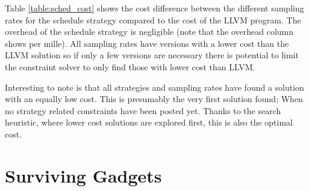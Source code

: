 \begin{table}[h]
		\centering
		\noindent\makebox[\textwidth]{%
			
		}
		\caption{The cost of the different sampling rates for the schedule strategy compared to the LLVM solution.%
		The difference column is the difference between the median cost of the sampling rate and the cost of the LLVM solution.}
		\label{table:sched_cost}
\end{table}

Table \ref{table:sched_cost} shows the cost difference between the different sampling
rates for the schedule strategy compared to the cost of the LLVM program. The overhead of
the schedule strategy is negligible (note that the overhead column shows per mille). All
sampling rates have versions with a lower cost than the LLVM solution so if only a few
versions are necessary there is potential to limit the constraint solver to only find
those with lower cost than LLVM.

Interesting to note is that all strategies and sampling rates have found a solution with
an equally low cost. This is presumably the very first solution found; When no strategy
related constraints have been posted yet. Thanks to the search heuristic, where lower cost
solutions are explored first, this is also the optimal cost.

\section{Surviving Gadgets}

